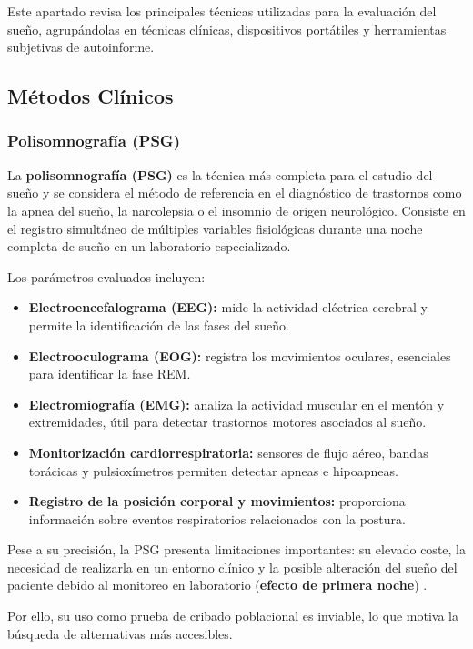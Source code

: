 Este apartado revisa los principales técnicas utilizadas para la evaluación del sueño, agrupándolas en técnicas clínicas, dispositivos portátiles y herramientas subjetivas de autoinforme.

\subsection{Métodos Clínicos}
\subsubsection{Polisomnografía (PSG)}
La \textbf{polisomnografía (PSG)} es la técnica más completa para el estudio del sueño y se considera el método de referencia en el diagnóstico de trastornos como la apnea del sueño, la narcolepsia o el insomnio de origen neurológico. Consiste en el registro simultáneo de múltiples variables fisiológicas durante una noche completa de sueño en un laboratorio especializado.

Los parámetros evaluados incluyen:

\begin{itemize}
    \item \textbf{Electroencefalograma (EEG):} mide la actividad eléctrica cerebral y permite la identificación de las fases del sueño.
    \item \textbf{Electrooculograma (EOG):} registra los movimientos oculares, esenciales para identificar la fase REM.
    \item \textbf{Electromiografía (EMG):} analiza la actividad muscular en el mentón y extremidades, útil para detectar trastornos motores asociados al sueño.
    \item \textbf{Monitorización cardiorrespiratoria:} sensores de flujo aéreo, bandas torácicas y pulsioxímetros permiten detectar apneas e hipoapneas.
    \item \textbf{Registro de la posición corporal y movimientos:} proporciona información sobre eventos respiratorios relacionados con la postura.
\end{itemize}
Pese a su precisión, la PSG presenta limitaciones importantes: su elevado coste, la necesidad de realizarla en un entorno clínico y la posible alteración del sueño del paciente debido al monitoreo en laboratorio (\textbf{efecto de primera noche}) \cite{polisomnografia}\cite{martin2025practicas}.

Por ello, su uso como prueba de cribado poblacional es inviable, lo que motiva la búsqueda de alternativas más accesibles.

